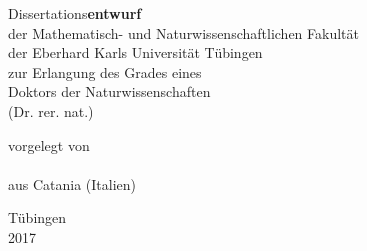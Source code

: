 \begin{titlepage}
\makeatletter %
\setlength{\parskip}{0pt}
\centering
\large
%
\linespread{1.5}\selectfont
\sffamily
\slshape
\selectfont

\vspace*{-2cm}

{\huge \bfseries
  \@title%
  \par%
}

\vspace{4cm}

{Dissertations\/\bfseries\upshape entwurf}\\
der Mathematisch- und Naturwissenschaftlichen Fakult\"at\\
der Eberhard Karls Universit\"at T\"ubingen\\
zur Erlangung des Grades eines\\
Doktors der Naturwissenschaften\\
(Dr. rer. nat.)

\vspace{4 cm}

vorgelegt von \\
\@author \\
aus Catania (Italien)

\vspace{2 cm}

T\"ubingen\\
2017

\vfill
\end{titlepage}
